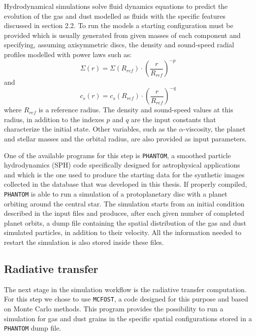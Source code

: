 \documentclass[a4paper,10pt]{report}
\begin{document}
Hydrodynamical simulations solve fluid dynamics equations to predict the evolution of the gas and dust 
modelled as fluids with the specific features discussed in section 2.2.
To run the models a starting configuration must be provided which is usually generated from given masses 
of each component and specifying, assuming axisymmetric discs, the density and sound-speed radial profiles modelled
with power laws such as:
\begin{equation}
    \Sigma(r) = \Sigma(R_{ref})\cdot\left(\frac{r}{R_{ref}}\right)^{-p}
\end{equation}
and
\begin{equation}
    c_s(r) = c_s(R_{ref})\cdot\left(\frac{r}{R_{ref}}\right)^{-q}
\end{equation}
where $R_{ref}$ is a reference radius. The density and sound-speed values at this radius, in addition to the indexes $p$ and $q$
are the input constants that characterize the initial state.
Other variables, such as the $\alpha$-viscosity, the planet and stellar masses and the orbital radius, are also provided as input parameters.

One of the available programs for this step is \lstinline{PHANTOM}, a smoothed particle hydrodynamics (SPH) code 
specifically designed for astrophysical applications and which is the one used to produce
the starting data for the synthetic images collected in the database that was developed in this thesis.
If properly compiled, \lstinline{PHANTOM} is able to run a simulation of a protoplanetary disc with a planet orbiting around the central star. 
The simulation starts from an initial condition described in the input files and produces, after each given number of completed planet orbits, a dump file
containing the spatial distribution of the gas and dust simulated particles, in addition to their velocity. 
All the information needed to restart the simulation is also stored inside these files.

\subsection{Radiative transfer}

The next stage in the simulation workflow is the radiative transfer computation. For this
step we chose to use \lstinline{MCFOST}, a code designed for this purpose and based on Monte Carlo methods.
This program provides the possibility to run a simulation for gas and dust grains in the specific 
spatial configurations stored in a \lstinline{PHANTOM} dump file.
\end{document}
